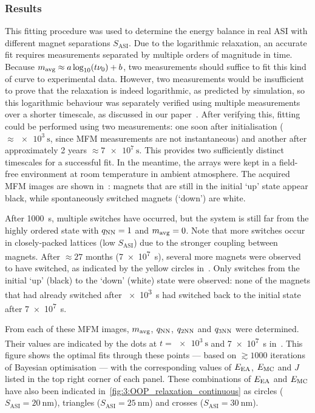 \subsubsection{Results} 
This fitting procedure was used to determine the energy balance in real ASI with different magnet separations $S_\mathrm{ASI}$.
Due to the logarithmic relaxation, an accurate fit requires measurements separated by multiple orders of magnitude in time.
Because $\mavg \approx a \log_{10}(t \nu_0) + b$, two measurements should suffice to fit this kind of curve to experimental data.
However, two measurements would be insufficient to prove that the relaxation is indeed logarithmic, as predicted by simulation, so this logarithmic behaviour was separately verified using multiple measurements over a shorter timescale, as discussed in our paper~\cite[Supp. 5.4]{KUR-24}.
After verifying this, fitting could be performed using two measurements: one soon after initialisation ($\approx \SI{e3}{\second}$, since MFM measurements are not instantaneous) and another after approximately 2 years $\approx \SI{7e7}{\second}$.
This provides two sufficiently distinct timescales for a successful fit.
In the meantime, the arrays were kept in a field-free environment at room temperature in ambient atmosphere.
The acquired MFM images are shown in~: magnets that are still in the initial `up' state appear black, while spontaneously switched magnets (`down') are white. \par
After \SI{1000}{\second}, multiple switches have occurred, but the system is still far from the highly ordered state with $\qNN=1$ and $\mavg=0$.
Note that more switches occur in closely-packed lattices (low $S_\mathrm{ASI}$) due to the stronger coupling between magnets.
After $\approx 27$ months (\SI{7e7}{\second}), several more magnets were observed to have switched, as indicated by the yellow circles in~.
Only switches from the initial `up' (black) to the `down' (white) state were observed: none of the magnets that had already switched after \SI{e3}{\second} had switched back to the initial state after \SI{7e7}{\second}. \par
From each of these MFM images, $\mavg$, $\qNN$, $\qNN[2]$ and $\qNN[3]$ were determined.
Their values are indicated by the dots at $t=\SI{e3}{\second}$ and \SI{7e7}{\second} in~.
This figure shows the optimal fits through these points --- based on $\gtrsim 1000$ iterations of Bayesian optimisation --- with the corresponding values of $\EEA$, $\EMC$ and $J$ listed in the top right corner of each panel.
These combinations of $\EEA$ and $\EMC$ have also been indicated in~\cref{fig:3:OOP_relaxation_continuous} as circles ($S_\mathrm{ASI}=\SI{20}{\nano\metre}$), triangles ($S_\mathrm{ASI}=\SI{25}{\nano\metre}$) and crosses ($S_\mathrm{ASI}=\SI{30}{\nano\metre}$).

